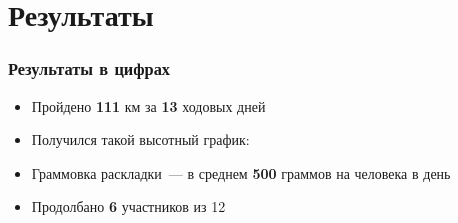 \section{Результаты}
\begin{frame}
	
	\frametitle[	содержимое...]{Результаты в цифрах}
	\begin{itemize}
		\item<+-> Пройдено \textbf{111} км за \textbf{13} ходовых дней
		\item<+-> Получился такой высотный график:
		\item<+-> Граммовка раскладки~--- в среднем \textbf{500} граммов на человека в день
		\item<+-> Продолбано \textbf{6} участников из 12
	\end{itemize}
	
\end{frame}

